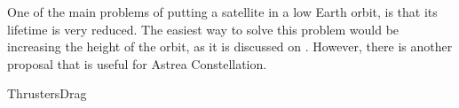 

One of the main problems of putting a satellite in a low Earth orbit, is that its lifetime is very reduced. The easiest way to solve this problem would be increasing the height of the orbit, as it is discussed on \cite[Chapter 4, Section 3]{annex1}. However, there is another proposal that is useful for Astrea Constellation.

{ThrustersDrag}